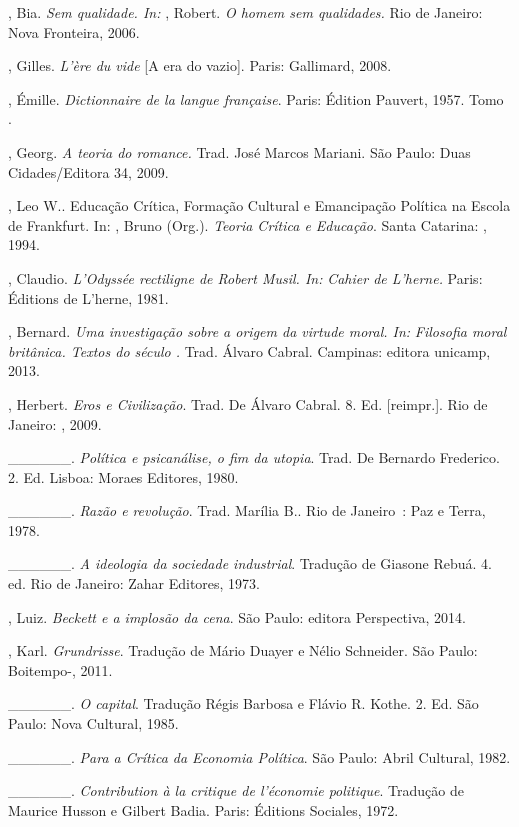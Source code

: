 {\begin{Parskip}
, Bia. \emph{Sem qualidade. In:} , Robert. \emph{O homem sem
qualidades.} Rio de Janeiro: Nova Fronteira, 2006.

, Gilles. \emph{L'ère du vide} [A era do vazio]. Paris:
Gallimard, 2008.

, Émille. \emph{Dictionnaire de la langue française}. Paris:
Édition Pauvert, 1957. Tomo .

, Georg. \emph{A teoria do romance.} Trad. José Marcos Mariani.
São Paulo: Duas Cidades/Editora 34, 2009.

, Leo W.. Educação Crítica, Formação Cultural e Emancipação Política
na Escola de Frankfurt. In: , Bruno (Org.). \emph{Teoria Crítica
e Educação}. Santa Catarina: , 1994.

, Claudio. \emph{L'Odyssée rectiligne de Robert Musil. In:}
\emph{Cahier de L'herne.} Paris: Éditions de L'herne, 1981.

, Bernard. \emph{Uma investigação sobre a origem da virtude
moral. In:} \emph{Filosofia moral britânica. Textos do século .}
Trad. Álvaro Cabral. Campinas: editora unicamp, 2013.

, Herbert. \emph{Eros e Civilização}. Trad. De Álvaro Cabral.
8. Ed. [reimpr.]. Rio de Janeiro: , 2009.

\_\_\_\_\_\_. \emph{Política e psicanálise, o fim da utopia}. Trad. De
Bernardo Frederico. 2. Ed. Lisboa: Moraes Editores, 1980.

\_\_\_\_\_\_. \emph{Razão e} \emph{revolução}. Trad. Marília B.. Rio
de Janeiro~: Paz e Terra, 1978.

\_\_\_\_\_\_. \emph{A ideologia da sociedade industrial}. Tradução de
Giasone Rebuá. 4. ed. Rio de Janeiro: Zahar Editores, 1973.

, Luiz. \emph{Beckett e a implosão da cena}. São Paulo: editora
Perspectiva, 2014.

, Karl. \emph{Grundrisse}. Tradução de Mário Duayer e Nélio
Schneider. São Paulo: Boitempo-, 2011.

\_\_\_\_\_\_. \emph{O capital}. Tradução Régis Barbosa e Flávio R.
Kothe. 2. Ed. São Paulo: Nova Cultural, 1985.

\_\_\_\_\_\_. \emph{Para a Crítica da Economia Política}. São Paulo:
Abril Cultural, 1982.

\_\_\_\_\_\_. \emph{Contribution à la critique de l'économie
politique}. Tradução de Maurice Husson e Gilbert Badia. Paris: Éditions
Sociales, 1972.


\end{Parskip}}

